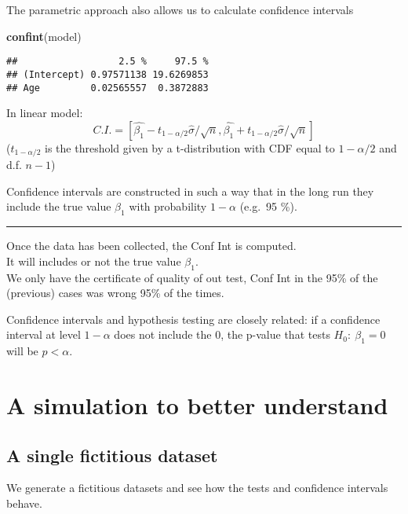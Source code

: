 \documentclass[]{article}
\newenvironment{Shaded}{\begin{snugshade}}{\end{snugshade}}
\newcommand{\KeywordTok}[1]{\textcolor[rgb]{0.13,0.29,0.53}{\textbf{#1}}}
\newcommand{\NormalTok}[1]{#1}
\begin{document}
The parametric approach also allows us to calculate confidence intervals

\begin{Shaded}
\begin{Highlighting}[]
\KeywordTok{confint}\NormalTok{(model)}
\end{Highlighting}
\end{Shaded}

\begin{verbatim}
##                  2.5 %     97.5 %
## (Intercept) 0.97571138 19.6269853
## Age         0.02565557  0.3872883
\end{verbatim}

In linear model:
\[C.I.= [ \hat{\beta_1}-t_{1-\alpha/2} \hat{\sigma}/\sqrt{n}, \hat{\beta_1}+t_{1-\alpha/2} \hat{\sigma}/\sqrt{n}]\]
(\(t_{1-\alpha/2}\) is the threshold given by a t-distribution with CDF
equal to \(1-\alpha/2\) and d.f. \(n-1\))

Confidence intervals are constructed in such a way that in the long run
they include the true value \(\beta_1\) with probability \(1-\alpha\)
(e.g.~95 \%).

\begin{center}\rule{0.5\linewidth}{\linethickness}\end{center}

Once the data has been collected, the Conf Int is computed.\\
It will includes or not the true value \(\beta_1\).\\
We only have the certificate of quality of out test, Conf Int in the
95\% of the (previous) cases was wrong 95\% of the times.

Confidence intervals and hypothesis testing are closely related: if a
confidence interval at level \(1-\alpha\) does not include the 0, the
p-value that tests \(H_0:\ \beta_1 = 0\) will be \(p<\alpha\).

\section{A simulation to better
understand}\label{a-simulation-to-better-understand}

\subsection{A single fictitious
dataset}\label{a-single-fictitious-dataset}

We generate a fictitious datasets and see how the tests and confidence
intervals behave.
\end{document}

